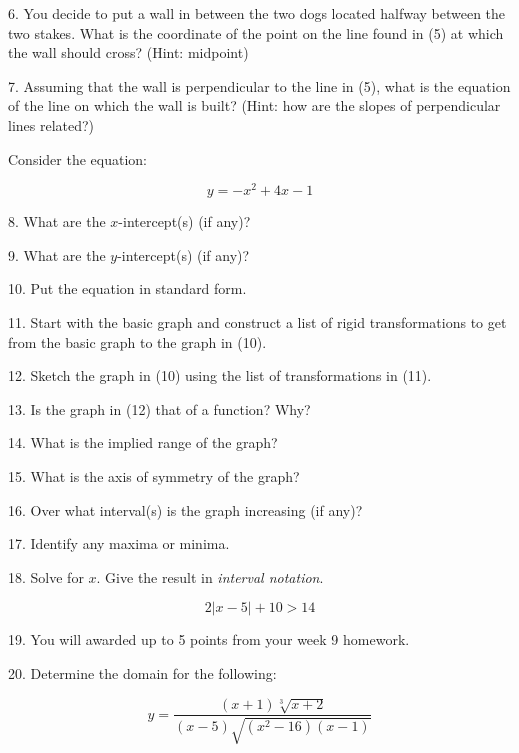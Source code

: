 \documentclass[letterpaper, 12pt]{article}
\begin{document}
\vspace{3in}

6. You decide to put a wall in between the two dogs located halfway between the
two stakes.  What is the coordinate of the point on the line found in (5) at
which the wall should cross? (Hint: midpoint)

\vspace{3in}

7. Assuming that the wall is perpendicular to the line in (5), what is the
equation of the line on which the wall is built? (Hint: how are the slopes of
perpendicular lines related?)

\newpage

Consider the equation:

\[y=-x^2+4x-1\]

\vspace{0.5in}

8. What are the $x$-intercept(s) (if any)?

\vspace{3in}

9. What are the $y$-intercept(s) (if any)?

\vspace{2in}

10. Put the equation in standard form.

\vspace{3in}

11. Start with the basic graph and construct a list of rigid transformations to
get from the basic graph to the graph in (10).

\vspace{3in}

12. Sketch the graph in (10) using the list of transformations in (11).

\vspace{4in}

13. Is the graph in (12) that of a function? Why?

\vspace{3in}

14. What is the implied range of the graph?

\vspace{2in}

15. What is the axis of symmetry of the graph?

\vspace{2in}

16. Over what interval(s) is the graph increasing (if any)?

\vspace{2in}

17. Identify any maxima or minima.

\newpage

18. Solve for $x$. Give the result in \emph{interval notation}.

\[2|x-5|+10>14\]

\vspace{3in}

19. You will awarded up to 5 points from your week 9 homework.

\bigskip

20. Determine the domain for the following:

\[y=\frac{(x+1)\sqrt[3]{x+2}}{(x-5)\sqrt{(x^2-16)(x-1)}}\]
\end{document}
